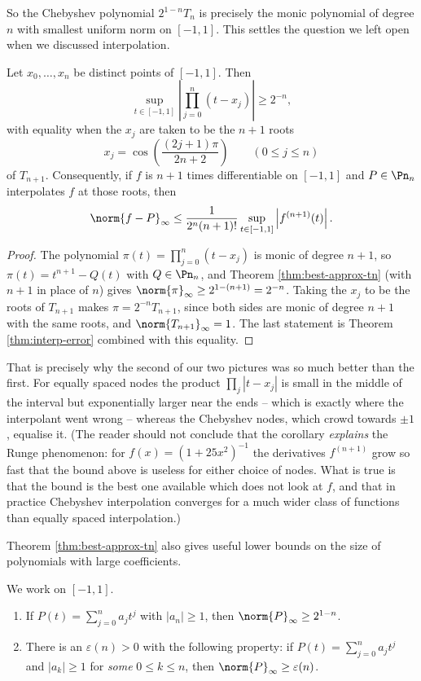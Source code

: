 So the Chebyshev polynomial $2^{1-n}T_n$ is precisely the monic polynomial of degree $n$ with smallest uniform norm on $[-1,1]$. This settles the question we left open when we discussed interpolation.

\begin{corollary}\label{cor:cheb-nodes}
	Let $x_0,\ldots,x_n$ be distinct points of $[-1,1]$. Then
	$$\sup_{t\in[-1,1]}\left|\prod_{j=0}^n(t-x_j)\right| \geq 2^{-n},$$
	with equality when the $x_j$ are taken to be the $n+1$ roots
	$$x_j = \cos\left(\frac{(2j+1)\pi}{2n+2}\right) \qquad (0 \leq j \leq n)$$
	of $T_{n+1}$. Consequently, if $f$ is $n+1$ times differentiable on $[-1,1]$ and $P\in\Pn_n$ interpolates $f$ at those roots, then
	$$\norm{f-P}_\infty \leq \frac{1}{2^n(n+1)!}\sup_{t\in[-1,1]}\left|f^{(n+1)}(t)\right|.$$
\end{corollary}

\begin{proof}
	The polynomial $\pi(t) = \prod_{j=0}^n(t-x_j)$ is monic of degree $n+1$, so $\pi(t) = t^{n+1}-Q(t)$ with $Q\in\Pn_n$, and Theorem \ref{thm:best-approx-tn} (with $n+1$ in place of $n$) gives $\norm{\pi}_\infty\geq2^{1-(n+1)} = 2^{-n}$. Taking the $x_j$ to be the roots of $T_{n+1}$ makes $\pi = 2^{-n}T_{n+1}$, since both sides are monic of degree $n+1$ with the same roots, and $\norm{T_{n+1}}_\infty=1$. The last statement is Theorem \ref{thm:interp-error} combined with this equality.
\end{proof}

That is precisely why the second of our two pictures was so much better than the first. For equally spaced nodes the product $\prod_j|t-x_j|$ is small in the middle of the interval but exponentially larger near the ends -- which is exactly where the interpolant went wrong -- whereas the Chebyshev nodes, which crowd towards $\pm1$, equalise it. (The reader should not conclude that the corollary \emph{explains} the Runge phenomenon: for $f(x)=(1+25x^2)^{-1}$ the derivatives $f^{(n+1)}$ grow so fast that the bound above is useless for either choice of nodes. What is true is that the bound is the best one available which does not look at $f$, and that in practice Chebyshev interpolation converges for a much wider class of functions than equally spaced interpolation.)

Theorem \ref{thm:best-approx-tn} also gives useful lower bounds on the size of polynomials with large coefficients.

\begin{corollary}\label{cor:coeff-bound}
	We work on $[-1,1]$.
	\begin{enumerate}[label=(\roman*)]
		\item If $P(t) = \sum_{j=0}^n a_jt^j$ with $|a_n|\geq1$, then $\norm{P}_\infty \geq 2^{1-n}$.
		\item There is an $\varepsilon(n)>0$ with the following property: if $P(t) = \sum_{j=0}^n a_jt^j$ and $|a_k|\geq1$ for \emph{some} $0\leq k\leq n$, then $\norm{P}_\infty\geq \varepsilon(n)$.
	\end{enumerate}
\end{corollary}


